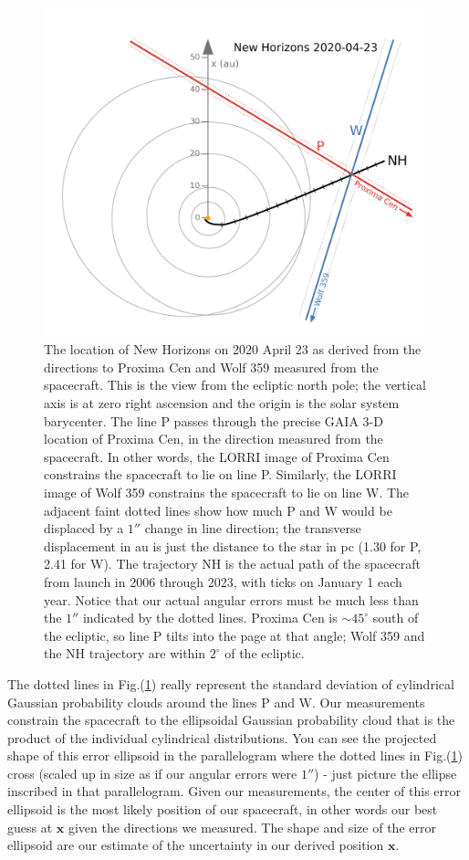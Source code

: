 \documentclass[]{aastex63}
\newcommand{\BV}[1]{\mathbf{#1}}
\begin{document}
\begin{figure}[hbtp]
\centering
\includegraphics[keepaspectratio,width=5.0 in]{nhfig1.png}
\caption{The location of New Horizons on 2020 April 23 as derived from the directions to Proxima Cen and Wolf 359 measured from the spacecraft.  This is the view from the ecliptic north pole; the vertical axis is at zero right ascension and the origin is the solar system barycenter.  The line P passes through the precise GAIA 3-D location of Proxima Cen, in the direction measured from the spacecraft.  In other words, the LORRI image of Proxima Cen constrains the spacecraft to lie on line P. Similarly, the LORRI image of Wolf 359 constrains the spacecraft to lie on line W.  The adjacent faint dotted lines show how much P and W would be displaced by a $1''$ change in line direction; the transverse displacement in au is just the distance to the star in pc (1.30 for P, 2.41 for W). The trajectory NH is the actual path of the spacecraft from launch in 2006 through 2023, with ticks on January 1 each year.  Notice that our actual angular errors must be much less than the $1''$ indicated by the dotted lines.  Proxima Cen is $\sim 45^\circ$ south of the ecliptic, so line P tilts into the page at that angle; Wolf 359 and the NH trajectory are within $2^\circ$ of the ecliptic.}
\label{fig:nav_wide}
\end{figure}

The dotted lines in Fig.(\ref{fig:nav_wide}) really represent the standard deviation of cylindrical Gaussian probability clouds around the lines P and W.  Our measurements constrain the spacecraft to the ellipsoidal Gaussian probability cloud that is the product of the individual cylindrical distributions.  You can see the projected shape of this error ellipsoid in the parallelogram where the dotted lines in Fig.(\ref{fig:nav_wide}) cross (scaled up in size as if our angular errors were $1''$) - just picture the ellipse inscribed in that parallelogram.  Given our measurements, the center of this error ellipsoid is the most likely position of our spacecraft, in other words our best guess at $\BV{x}$ given the directions we measured. The shape and size of the error ellipsoid are our estimate of the uncertainty in our derived position $\BV{x}.$
\end{document}
